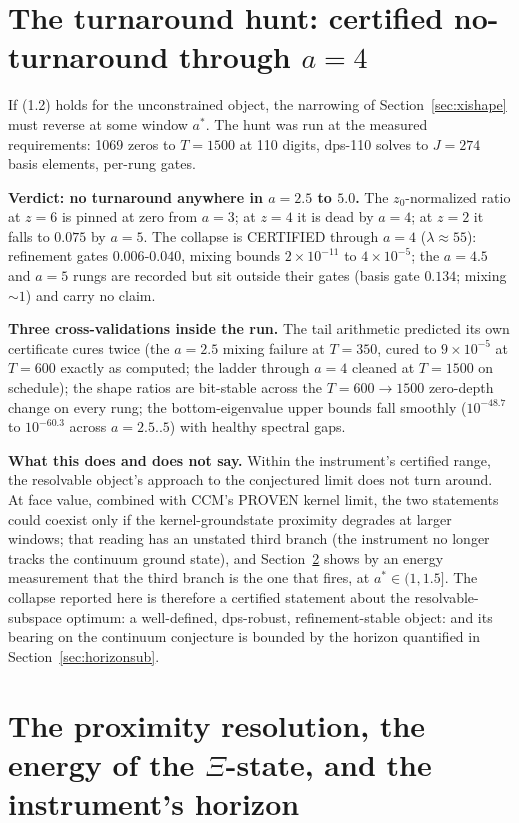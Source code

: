 \documentclass[10pt]{article}
\begin{document}
\section{The turnaround hunt: certified no-turnaround through $a = 4$}\label{sec:turnaround}

If (1.2) holds for the unconstrained object, the narrowing of Section~\ref{sec:xishape} must reverse at some window $a^*$. The hunt was run at the measured requirements: 1069 zeros to $T = 1500$ at 110 digits, dps-110 solves to $J = 274$ basis elements, per-rung gates.

\textbf{Verdict: no turnaround anywhere in $a = 2.5$ to $5.0$.} The $z_0$-normalized ratio at $z = 6$ is pinned at zero from $a = 3$; at $z = 4$ it is dead by $a = 4$; at $z = 2$ it falls to $0.075$ by $a = 5$. The collapse is CERTIFIED through $a = 4$ ($\lambda \approx 55$): refinement gates $0.006$-$0.040$, mixing bounds $2 \times 10^{-11}$ to $4 \times 10^{-5}$; the $a = 4.5$ and $a = 5$ rungs are recorded but sit outside their gates (basis gate $0.134$; mixing $\sim 1$) and carry no claim.

\textbf{Three cross-validations inside the run.} The tail arithmetic predicted its own certificate cures twice (the $a = 2.5$ mixing failure at $T = 350$, cured to $9 \times 10^{-5}$ at $T = 600$ exactly as computed; the ladder through $a = 4$ cleaned at $T = 1500$ on schedule); the shape ratios are bit-stable across the $T = 600 \to 1500$ zero-depth change on every rung; the bottom-eigenvalue upper bounds fall smoothly ($10^{-48.7}$ to $10^{-60.3}$ across $a = 2.5..5$) with healthy spectral gaps.

\textbf{What this does and does not say.} Within the instrument's certified range, the resolvable object's approach to the conjectured limit does not turn around. At face value, combined with CCM's PROVEN kernel limit, the two statements could coexist only if the kernel-groundstate proximity degrades at larger windows; that reading has an unstated third branch (the instrument no longer tracks the continuum ground state), and Section~\ref{sec:horizon} shows by an energy measurement that the third branch is the one that fires, at $a^* \in (1, 1.5]$. The collapse reported here is therefore a certified statement about the resolvable-subspace optimum: a well-defined, dps-robust, refinement-stable object: and its bearing on the continuum conjecture is bounded by the horizon quantified in Section~\ref{sec:horizonsub}.

\section{The proximity resolution, the energy of the $\Xi$-state, and the instrument's horizon}\label{sec:horizon}
\end{document}
